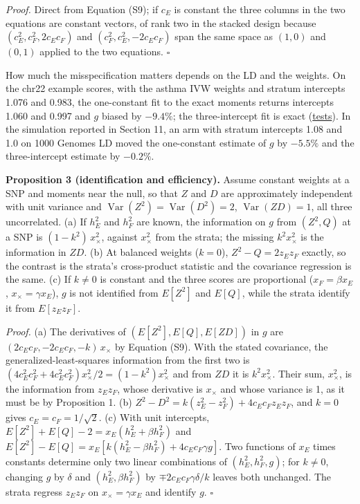 \documentclass[11pt,a4paper]{article}
\begin{document}
\emph{Proof.} Direct from Equation (S9); if \(c_E\) is constant the three columns in the two equations are constant vectors, of rank two in the stacked design because \((c_E^2,c_F^2,2c_Ec_F)\) and \((c_F^2,c_E^2,-2c_Ec_F)\) span the same space as \((1,0)\) and \((0,1)\) applied to the two equations. \(\square\)

How much the misspecification matters depends on the LD and the weights. On the chr22 example scores, with the asthma IVW weights and stratum intercepts 1.076 and 0.983, the one-constant fit to the exact moments returns intercepts 1.060 and 0.997 and \(g\) biased by \(-9.4\%\); the three-intercept fit is exact (\href{../tests/test_q_heterogeneity.py}{tests}). In the simulation reported in Section 11, an arm with stratum intercepts 1.08 and 1.0 on 1000 Genomes LD moved the one-constant estimate of \(g\) by \(-5.5\%\) and the three-intercept estimate by \(-0.2\%\).

\textbf{Proposition 3 (identification and efficiency).} Assume constant weights at a SNP and moments near the null, so that \(Z\) and \(D\) are approximately independent with unit variance and \(\operatorname{Var}(Z^2)=\operatorname{Var}(D^2)=2\), \(\operatorname{Var}(ZD)=1\), all three uncorrelated.
(a) If \(h_E^2\) and \(h_F^2\) are known, the information on \(g\) from \((Z^2,Q)\) at a SNP is \((1-k^2)\,x_\times^2\), against \(x_\times^2\) from the strata; the missing \(k^2x_\times^2\) is the information in \(ZD\).
(b) At balanced weights (\(k=0\)), \(Z^2-Q=2z_Ez_F\) exactly, so the contrast is the strata's cross-product statistic and the covariance regression is the same.
(c) If \(k\neq0\) is constant and the three scores are proportional (\(x_F=\beta x_E\), \(x_\times=\gamma x_E\)), \(g\) is not identified from \(E[Z^2]\) and \(E[Q]\), while the strata identify it from \(E[z_Ez_F]\).

\emph{Proof.} (a) The derivatives of \((E[Z^2],E[Q],E[ZD])\) in \(g\) are \((2c_Ec_F,-2c_Ec_F,-k)\,x_\times\) by Equation (S9). With the stated covariance, the generalized-least-squares information from the first two is \((4c_E^2c_F^2+4c_E^2c_F^2)x_\times^2/2=(1-k^2)x_\times^2\) and from \(ZD\) it is \(k^2x_\times^2\). Their sum, \(x_\times^2\), is the information from \(z_Ez_F\), whose derivative is \(x_\times\) and whose variance is 1, as it must be by Proposition 1. (b) \(Z^2-D^2=k(z_E^2-z_F^2)+4c_Ec_Fz_Ez_F\), and \(k=0\) gives \(c_E=c_F=1/\sqrt2\). (c) With unit intercepts, \(E[Z^2]+E[Q]-2=x_E(h_E^2+\beta h_F^2)\) and \(E[Z^2]-E[Q]=x_E\left[k(h_E^2-\beta h_F^2)+4c_Ec_F\gamma g\right]\). Two functions of \(x_E\) times constants determine only two linear combinations of \((h_E^2,h_F^2,g)\); for \(k\neq0\), changing \(g\) by \(\delta\) and \((h_E^2,\beta h_F^2)\) by \(\mp2c_Ec_F\gamma\delta/k\) leaves both unchanged. The strata regress \(z_Ez_F\) on \(x_\times=\gamma x_E\) and identify \(g\). \(\square\)
\end{document}
